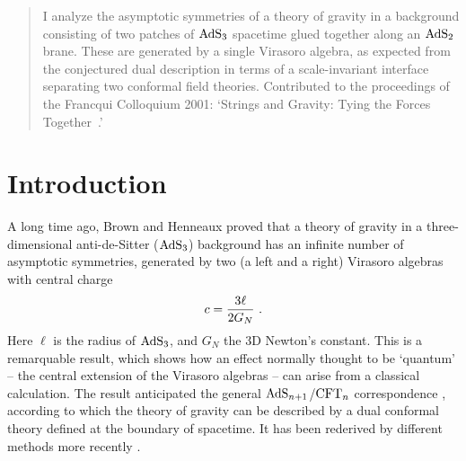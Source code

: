 \documentclass[a4paper,12pt,oneside]{article}
\begin{document}
\begin{quote}\small
I analyze  the asymptotic symmetries of 
a theory of gravity in a 
background consisting of two patches of ${\rm AdS}_3$  spacetime
glued together along an  ${\rm AdS}_2$ brane. 
These  are generated by a  single Virasoro algebra, 
as expected from  the conjectured dual description
in terms of a scale-invariant 
interface separating two conformal field theories. 
Contributed  to the proceedings of
the Francqui Colloquium 2001: `Strings and Gravity:
Tying the Forces Together~.'



\end{quote}

\baselineskip18pt

\newpage



\setcounter{equation}{0}
\section{Introduction}

  A long time ago, Brown and Henneaux \cite{BH} proved that 
a theory of gravity in a
three-dimensional anti-de-Sitter (${\rm AdS}_3$) background has 
an infinite number of asymptotic symmetries, 
generated by two (a left and a right) 
Virasoro algebras   with central charge
\begin{equation}
 c = {3\ell\over 2  G_N}\ .
\end{equation}
\vskip 0.1cm \noindent
Here $\ell$ is the radius of
 ${\rm AdS}_3$,  and $G_N$ the 3D  Newton's constant. 
This is a  remarquable result,  which  shows  how an effect normally 
thought to be  `quantum'  -- the central extension 
of the Virasoro algebras  
--  can arise  from a  classical calculation. 
The result anticipated
the  general ${\rm AdS}_{n+1}$/${\rm CFT}_n$ correspondence \cite{M12}, 
according to which the theory of gravity can be described
by a dual  conformal  theory defined  
at the boundary of  spacetime. It has been rederived by different methods
more recently \cite{HSken,BK,dSS,adam}. 
\end{document}
